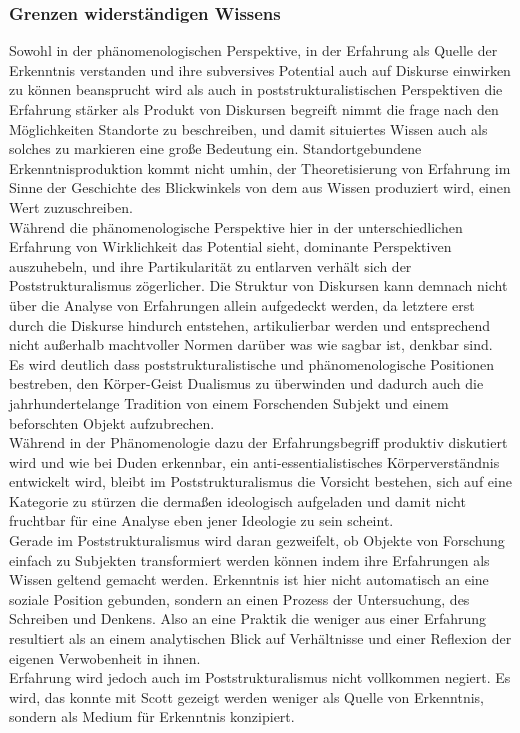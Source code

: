 \subsubsection{Grenzen widerständigen Wissens}

Sowohl in der phänomenologischen Perspektive, in der Erfahrung als Quelle der
Erkenntnis verstanden und ihre subversives Potential auch auf Diskurse
einwirken zu können beansprucht wird \footnotemark {} als auch in poststrukturalistischen
Perspektiven die Erfahrung stärker als Produkt von Diskursen begreift
\footnotemark {} nimmt
die frage nach den Möglichkeiten Standorte zu beschreiben, und damit situiertes
Wissen auch als solches zu markieren eine große Bedeutung ein.
Standortgebundene Erkenntnisproduktion kommt nicht umhin, der Theoretisierung
von Erfahrung im Sinne der Geschichte des Blickwinkels von dem aus Wissen
produziert wird, einen Wert zuzuschreiben.\\
Während die phänomenologische
Perspektive hier in der unterschiedlichen Erfahrung von Wirklichkeit das
Potential sieht, dominante Perspektiven auszuhebeln, und ihre Partikularität
zu entlarven verhält sich der Poststrukturalismus zögerlicher. Die Struktur von
Diskursen kann demnach nicht über die Analyse von Erfahrungen allein aufgedeckt
werden, da letztere erst durch die Diskurse hindurch entstehen, artikulierbar
werden und entsprechend nicht außerhalb machtvoller Normen darüber was wie
sagbar ist, denkbar sind.\\

\noindent Es wird deutlich dass poststrukturalistische und phänomenologische Positionen
bestreben, den Körper-Geist Dualismus zu überwinden und dadurch auch die
jahrhundertelange Tradition von einem Forschenden Subjekt und einem beforschten
Objekt aufzubrechen. \\
Während in der Phänomenologie dazu der Erfahrungsbegriff
produktiv diskutiert wird und wie bei Duden erkennbar, ein
anti-essentialistisches Körperverständnis entwickelt wird, bleibt im
Poststrukturalismus die Vorsicht bestehen, sich auf eine Kategorie zu stürzen
die dermaßen ideologisch aufgeladen und damit nicht fruchtbar für eine Analyse
eben jener Ideologie zu sein scheint. \\
Gerade im Poststrukturalismus wird daran
gezweifelt, ob Objekte von Forschung einfach zu Subjekten transformiert werden
können indem ihre Erfahrungen als Wissen geltend gemacht werden. Erkenntnis ist
hier nicht automatisch an eine soziale Position gebunden, sondern an einen
Prozess der Untersuchung, des Schreiben und Denkens. Also an eine Praktik die
weniger aus einer Erfahrung resultiert als an einem analytischen Blick auf
Verhältnisse und einer Reflexion der eigenen Verwobenheit in ihnen. \\
Erfahrung
wird jedoch auch im Poststrukturalismus nicht vollkommen negiert. Es wird, das
konnte mit Scott gezeigt werden weniger als Quelle von Erkenntnis, sondern als
Medium für Erkenntnis konzipiert.\\

